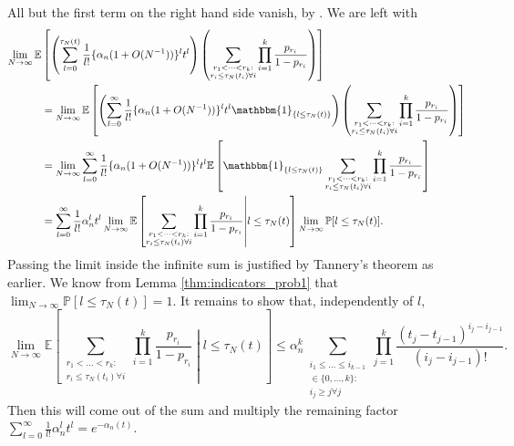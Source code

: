 \documentclass{article}
\newcommand{\Prob}{\mathbb{P}}
\newcommand{\E}{\mathbb{E}}
\newcommand{\I}[1]{\mathbbm{1}_{\{#1\}}}
\newcommand{\1}[1]{\mathbbm{1}_{#1}}
\begin{document}
All but the first term on the right hand side vanish, by \citet[Equations (3)--(5)]{brown2020}. We are left with
\begin{align}
\lim_{N\to\infty} \E &\left[  \left( \sum_{l=0}^{\tau_N(t)} \frac{1}{l!} \{\alpha_n (1+O(N^{-1})) \}^l t^l \right) \left( \sum_{\substack{r_1<\dots<r_k :\\ r_i\leq \tau_N(t_i) \forall i}} \prod_{i=1}^k \frac{p_{r_i}}{1-p_{r_i}} \right) \right] \notag\\
&= \lim_{N\to\infty} \E \left[  \left( \sum_{l=0}^\infty \frac{1}{l!} \{\alpha_n (1+O(N^{-1})) \}^l t^l \I{l\leq \tau_N(t)} \right) \left( \sum_{\substack{r_1<\dots<r_k :\\ r_i\leq \tau_N(t_i) \forall i}} \prod_{i=1}^k \frac{p_{r_i}}{1-p_{r_i}} \right) \right] \notag\\
&= \lim_{N\to\infty} \sum_{l=0}^\infty \frac{1}{l!} \{\alpha_n (1+O(N^{-1})) \}^l t^l \E\left[ \I{l\leq \tau_N(t)} \sum_{\substack{r_1<\dots<r_k :\\ r_i\leq \tau_N(t_i) \forall i}} \prod_{i=1}^k \frac{p_{r_i}}{1-p_{r_i}} \right] \notag\\
&= \sum_{l=0}^\infty \frac{1}{l!} \alpha_n^l t^l  \lim_{N\to\infty} \E\left[ \sum_{\substack{r_1<\dots<r_k :\\ r_i\leq \tau_N(t_i) \forall i}} \prod_{i=1}^k \frac{p_{r_i}}{1-p_{r_i}} \middle|  l \leq \tau_N(t)\right] \lim_{N\to\infty} \Prob[ l \leq \tau_N(t) ] .
\end{align}
Passing the limit inside the infinite sum is justified by Tannery's theorem as earlier. We know from Lemma \ref{thm:indicators_prob1} that $\lim_{N\to\infty} \Prob[ l \leq \tau_N(t) ] =1$.
It remains to show that, independently of $l$,
\begin{equation}
\lim_{N\to\infty} \E \left[ \sum_{\substack{r_1<\dots<r_k :\\ r_i\leq \tau_N(t_i) \forall i}} \prod_{i=1}^k \frac{p_{r_i}}{1-p_{r_i}} \middle|  l \leq \tau_N(t) \right] 
\leq \alpha_n^k \sum_{\substack{i_1\leq \dots\leq i_{k-1}\\ \in \{0,\dots,k\} :\\ i_j \geq j \forall j}} \prod_{j=1}^k \frac{(t_j - t_{j-1})^{i_j - i_{j-1}}}{(i_j - i_{j-1})! } .
\end{equation}
Then this will come out of the sum and multiply the remaining factor $ \sum_{l=0}^\infty \frac{1}{l!} \alpha_n^l t^l = e^{-\alpha_n(t)}$.
\end{document}
